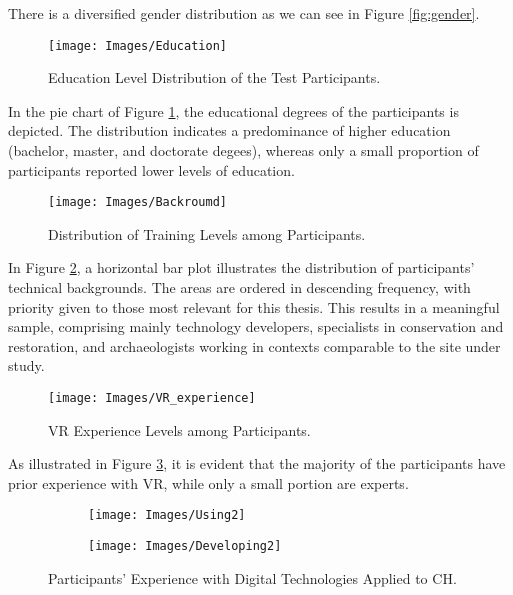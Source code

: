 There is a diversified gender distribution as we can see in Figure \ref{fig:gender}.

\begin{figure}[h!]
    \centering
    \texttt{[image: Images/Education]}
    \caption{Education Level Distribution of the Test Participants.} 
    \label{fig:education}
\end{figure}

In the pie chart of Figure \ref{fig:education}, the educational degrees of the participants is depicted. 
The distribution indicates a predominance of higher education (bachelor, master, and doctorate degees), whereas only a small proportion of participants reported lower levels of education.


\begin{figure}[h!]
    \centering
    \texttt{[image: Images/Backroumd]}
    \caption{Distribution of Training Levels among Participants.} 
    \label{fig:background}
\end{figure}

In Figure \ref{fig:background}, a horizontal bar plot illustrates the distribution of participants’ technical backgrounds. 
The areas are ordered in descending frequency, with priority given to those most relevant for this thesis. 
This results in a meaningful sample, comprising mainly technology developers, specialists in conservation and restoration, and archaeologists working in contexts comparable to the site under study.

\begin{figure}[h!]
    \centering
    \texttt{[image: Images/VR\_experience]}
    \caption{\gls{VR} Experience Levels among Participants.} 
    \label{fig:VR_experience}
\end{figure}

As illustrated in Figure \ref{fig:VR_experience}, it is evident that the majority of the participants have prior experience with \gls{VR}, while only a small portion are experts.

\begin{figure}[h!]
  \centering
  \begin{subfigure}[b]{0.47\textwidth}
      \centering
      \texttt{[image: Images/Using2]}
      \label{fig:Using}
  \end{subfigure}
  \hfill
  \begin{subfigure}[b]{0.47\textwidth}
      \centering
      \texttt{[image: Images/Developing2]}
      \label{fig:Developing}
  \end{subfigure}
     \caption{Participants’ Experience with Digital Technologies Applied to \gls{CH}.}
     \label{fig:hertiage_techs}
\end{figure}
\FloatBarrier

